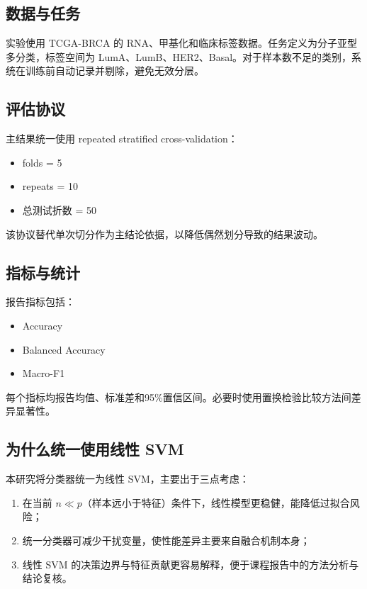\subsection{数据与任务}

实验使用 TCGA-BRCA 的 RNA、甲基化和临床标签数据。任务定义为分子亚型多分类，标签空间为 LumA、LumB、HER2、Basal。对于样本数不足的类别，系统在训练前自动记录并剔除，避免无效分层。

\subsection{评估协议}

主结果统一使用 repeated stratified cross-validation：

\begin{itemize}
    \item folds = 5
    \item repeats = 10
    \item 总测试折数 = 50
\end{itemize}

该协议替代单次切分作为主结论依据，以降低偶然划分导致的结果波动。

\subsection{指标与统计}

报告指标包括：

\begin{itemize}
    \item Accuracy
    \item Balanced Accuracy
    \item Macro-F1
\end{itemize}

每个指标均报告均值、标准差和95\%置信区间。必要时使用置换检验比较方法间差异显著性。

\subsection{为什么统一使用线性 SVM}

本研究将分类器统一为线性 SVM，主要出于三点考虑：

\begin{enumerate}
    \item 在当前 $n\ll p$（样本远小于特征）条件下，线性模型更稳健，能降低过拟合风险；
    \item 统一分类器可减少干扰变量，使性能差异主要来自融合机制本身；
    \item 线性 SVM 的决策边界与特征贡献更容易解释，便于课程报告中的方法分析与结论复核。
\end{enumerate}


